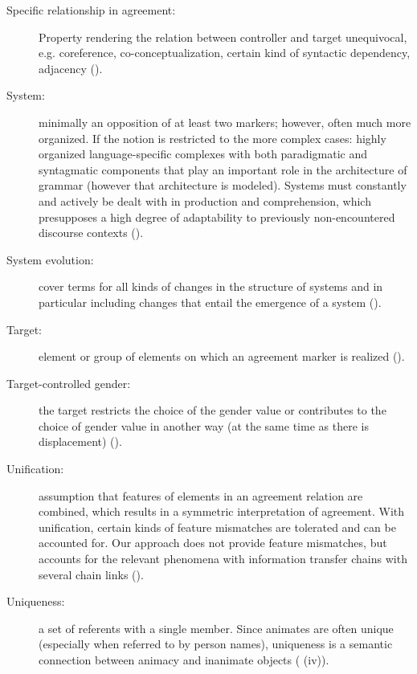 \documentclass[output=collectionpaper]{langsci/langscibook}
\begin{document}
{\begin{description}
\item  [Specific relationship in agreement:] Property rendering the relation between controller and target unequivocal, e.g. coreference, co-conceptualization, certain kind of syntactic dependency, adjacency ().
\item  [System:] minimally an opposition of at least two markers; however, often much more organized. If the notion is restricted to the more complex cases: highly organized language-specific complexes with both paradigmatic and syntagmatic components that play an important role in the architecture of grammar (however that architecture is modeled). Systems must constantly and actively be dealt with in production and comprehension, which presupposes a high degree of adaptability to previously non-encountered discourse contexts ().
\item  [System evolution:] cover terms for all kinds of changes in the structure of systems and in particular including changes that entail the emergence of a system ().
\item  [Target:] element or group of elements on which an agreement marker is realized ().
\item  [Target-controlled gender:] the target restricts the choice of the gender value or contributes to the choice of gender value in another way (at the same time as there is displacement) ().
\item  [Unification:] assumption that features of elements in an agreement relation are combined, which results in a symmetric interpretation of agreement. With unification, certain kinds of feature mismatches are tolerated and can be accounted for. Our approach does not provide feature mismatches, but accounts for the relevant phenomena with information transfer chains with several chain links ().
\item  [Uniqueness:] a set of referents with a single member. Since animates are often unique (especially when referred to by person names), uniqueness is a semantic connection between animacy and inanimate objects ( (iv)).
\end{description}}
\label{lastpage:WDG}
\end{document}
